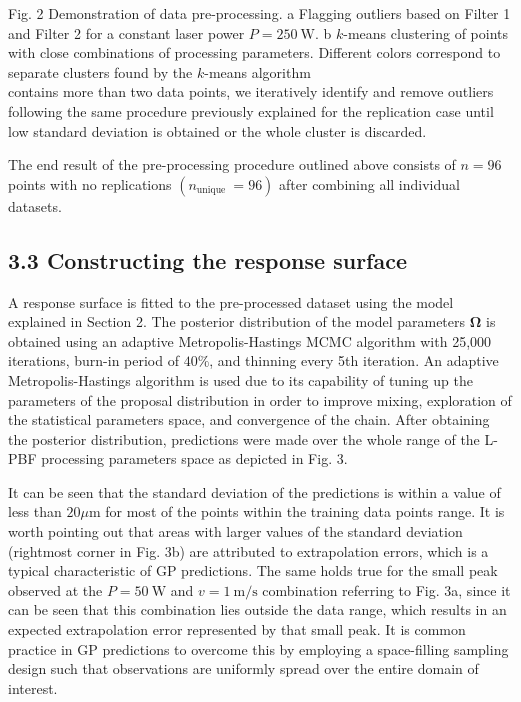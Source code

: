 \documentclass[10pt]{article}
\begin{document}
Fig. 2 Demonstration of data pre-processing. a Flagging outliers based on Filter 1 and Filter 2 for a constant laser power $P=250 \mathrm{~W}$. b $k$-means clustering of points with close combinations of processing parameters. Different colors correspond to separate clusters found by the $k$-means algorithm\\
contains more than two data points, we iteratively identify and remove outliers following the same procedure previously explained for the replication case until low standard deviation is obtained or the whole cluster is discarded.

The end result of the pre-processing procedure outlined above consists of $n=96$ points with no replications $\left(n_{\text {unique }}=96\right)$ after combining all individual datasets.

\subsection*{3.3 Constructing the response surface}
A response surface is fitted to the pre-processed dataset using the model explained in Section 2. The posterior distribution of the model parameters $\boldsymbol{\Omega}$ is obtained using an adaptive Metropolis-Hastings MCMC algorithm with 25,000 iterations, burn-in period of $40 \%$, and thinning every 5th iteration. An adaptive Metropolis-Hastings algorithm is used due to its capability of tuning up the parameters of the proposal distribution in order to improve mixing, exploration of the statistical parameters space, and convergence of the chain. After obtaining the posterior distribution, predictions were made over the whole range of the L-PBF processing parameters space as depicted in Fig. 3.

It can be seen that the standard deviation of the predictions is within a value of less than $20 \mu \mathrm{m}$ for most of the points within the training data points range. It is worth pointing out that areas with larger values of the standard deviation (rightmost corner in Fig. 3b) are attributed to extrapolation errors, which is a typical characteristic of GP predictions. The same holds true for the small peak observed at the $P=50 \mathrm{~W}$ and $v=1 \mathrm{~m} / \mathrm{s}$ combination referring to Fig. 3a, since it can be seen that this combination lies outside the data range, which results in an expected extrapolation error represented by that small peak. It is common practice in GP predictions to overcome this by employing a space-filling sampling design such that observations are uniformly spread over the entire domain of interest.
\end{document}
